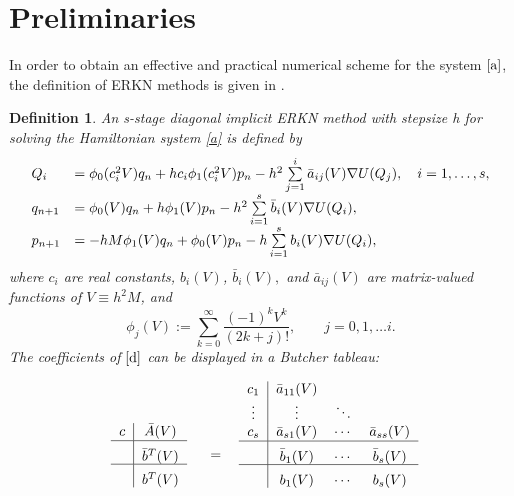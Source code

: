 \documentclass{article}
\newtheorem{defi}{Definition}
\begin{document}
\section{Preliminaries}
\label{sec:knowledges}In order to obtain an effective and practical
numerical scheme for the system $\eqref{a}$, the definition of
 ERKN methods is given in \cite{wu2013-book}.
\begin{defi}
\label{erkn} An s-stage diagonal implicit ERKN method with stepsize
h for solving the
Hamiltonian system \eqref{a} is defined by%
\begin{equation}
\begin{array}
[c]{ll}%
Q_{i} &
=\phi_{0}(c_{i}^{2}V)q_{n}+hc_{i}\phi_{1}(c_{i}^{2}V)p_{n}-h^{2}\textstyle\sum\limits_{j=1}^{i}\bar{a}_{ij}(V)\nabla U(Q_{j}),\ \ \ i=1,\ldots,s,\\
q_{n+1} & =\phi_{0}(V)q_{n}+h\phi_{1}(V)p_{n}-h^{2}\textstyle\sum
\limits_{i=1}^{s}\bar{b}_{i}(V)\nabla U(Q_{i}),\\
p_{n+1} &
=-hM\phi_{1}(V)q_{n}+\phi_{0}(V)p_{n}-h\textstyle\sum\limits_{i=1}^{s}b_{i}(V)\nabla
U(Q_{i}),
\end{array}
  \label{d}%
\end{equation}
where $c_i$ are real constants, $b_{i}(V)$, $\bar{b}_{i}(V),$ and
$\bar{a}_{ij}(V)$ are matrix-valued functions of $V\equiv h^{2}M$,
and
\begin{equation}
\phi_{j}(V):=\sum\limits_{k=0}^{\infty}\dfrac{(-1)^{k}V^{k}}{(2k+j)!},\qquad j=0,1,\ldots i.%
\label{e}%
\end{equation}
The coefficients of $\eqref{d}$ can be displayed in a Butcher
tableau:

\[%
\begin{tabular}
[c]{l}%
\\
\\[2mm]%
\begin{tabular}
[c]{c|c}%
$c$ & $\bar{A}(V)$\\\hline &
$\raisebox{-1.3ex}[0pt]{$\bar{b}^T(V)$}$\\\hline
& $\raisebox{-1.3ex}[0.5pt]{$b^T(V)$}$%
\end{tabular}
$\ \quad=$ $\ $%
\end{tabular}%
\begin{tabular}
[c]{c|ccc}%
$c_{1}$ & $\bar{a}_{11}(V)$ \\
$\vdots$ & $\vdots$ & $\ddots$ \\
$c_{s}$ & $\bar{a}_{s1}(V)$ & $\cdots$ & $\bar{a}_{ss}(V)$\\\hline &
$\raisebox{-1.3ex}[0.5pt]{$\bar{b}_1(V)$}$ &
\raisebox{-1.3ex}{$\cdots$} &
$\raisebox{-1.3ex}[0.5pt]{$\bar{b}_s(V)$}$\\\hline &
$\raisebox{-1.3ex}[1.0pt]{$b_1(V)$}$ &
$\raisebox{-1.3ex}[1.0pt]{$\cdots$}$
& $\raisebox{-1.3ex}[1.0pt]{$b_s(V)$}$%
\end{tabular}
\]
\end{defi}
\end{document}
